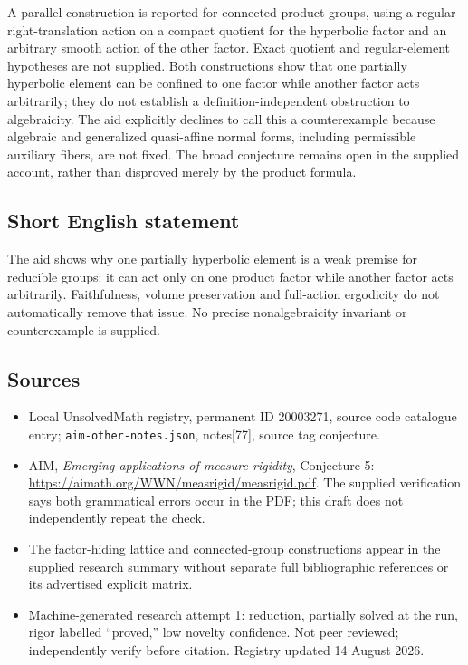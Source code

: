 \documentclass[11pt]{article}
\begin{document}
A parallel construction is reported for connected product groups, using a regular right-translation action on a compact quotient for the hyperbolic factor and an arbitrary smooth action of the other factor. Exact quotient and regular-element hypotheses are not supplied. Both constructions show that one partially hyperbolic element can be confined to one factor while another factor acts arbitrarily; they do not establish a definition-independent obstruction to algebraicity. The aid explicitly declines to call this a counterexample because algebraic and generalized quasi-affine normal forms, including permissible auxiliary fibers, are not fixed. The broad conjecture remains open in the supplied account, rather than disproved merely by the product formula.
\subsection{Short English statement}
The aid shows why one partially hyperbolic element is a weak premise for reducible groups: it can act only on one product factor while another factor acts arbitrarily. Faithfulness, volume preservation and full-action ergodicity do not automatically remove that issue. No precise nonalgebraicity invariant or counterexample is supplied.
\subsection{Sources}
\begin{itemize}
\item Local UnsolvedMath registry, permanent ID 20003271, source code catalogue entry; \texttt{aim-other-notes.json}, notes[77], source tag conjecture.
\item AIM, \emph{Emerging applications of measure rigidity}, Conjecture 5: \url{https://aimath.org/WWN/measrigid/measrigid.pdf}. The supplied verification says both grammatical errors occur in the PDF; this draft does not independently repeat the check.
\item The factor-hiding lattice and connected-group constructions appear in the supplied research summary without separate full bibliographic references or its advertised explicit matrix.
\item Machine-generated research attempt 1: reduction, partially solved at the run, rigor labelled ``proved,'' low novelty confidence. Not peer reviewed; independently verify before citation. Registry updated 14 August 2026.
\end{itemize}
\end{document}
